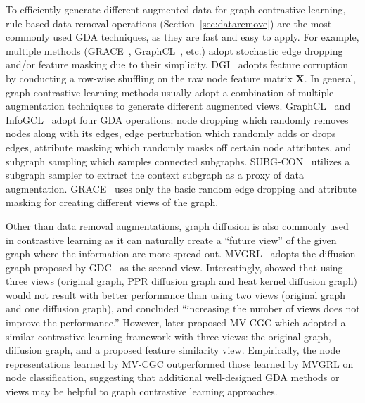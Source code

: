 \documentclass[11pt]{article}
\begin{document}
To efficiently generate different augmented data for graph contrastive learning, rule-based data removal operations (Section~\ref{sec:dataremove}) are the most commonly used GDA techniques, as they are fast and easy to apply. For example, multiple methods (GRACE~\cite{zhu2020deep}, GraphCL~\cite{you2020graph}, etc.) adopt stochastic edge dropping and/or feature masking due to their simplicity. DGI~\cite{velickovic2019deep} adopts feature corruption by conducting a row-wise shuffling on the raw node feature matrix $\mathbf{X}$. In general, graph contrastive learning methods usually adopt a combination of multiple augmentation techniques to generate different augmented views. 
GraphCL~\cite{you2020graph} and InfoGCL~\cite{xu2021infogcl} adopt four GDA operations: node dropping which randomly removes nodes along with its edges, edge perturbation which randomly adds or drops edges, attribute masking which randomly masks off certain node attributes, and subgraph sampling which samples connected subgraphs. SUBG-CON~\cite{jiao2020sub} utilizes a subgraph sampler to extract the context subgraph as a proxy of data augmentation.
GRACE~\cite{zhu2020deep} uses only the basic random edge dropping and attribute masking for creating different views of the graph. 

Other than data removal augmentations, graph diffusion is also commonly used in contrastive learning as it can naturally create a ``future view'' of the given graph where the information are more spread out. MVGRL~\cite{hassani2020contrastive} adopts the diffusion graph proposed by GDC~\cite{klicpera2019diffusion} as the second view. Interestingly, \citet{hassani2020contrastive} showed that using three views (original graph, PPR diffusion graph and heat kernel diffusion graph) would not result with better performance than using two views (original graph and one diffusion graph), and concluded ``increasing the number of views does not improve the performance.'' However, \citet{yuan2021semi} later proposed MV-CGC which adopted a similar contrastive learning framework with three views: the original graph, diffusion graph, and a proposed feature similarity view. Empirically, the node representations learned by MV-CGC outperformed those learned by MVGRL on node classification, suggesting that additional well-designed GDA methods or views may be helpful to graph contrastive learning approaches.
\end{document}
